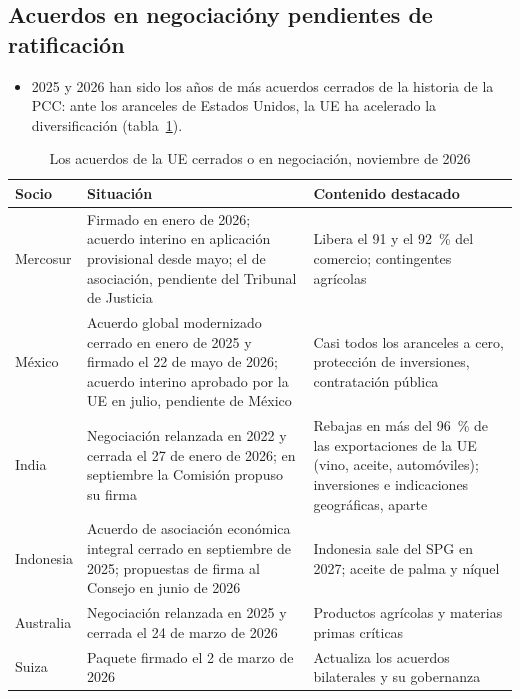 \documentclass[11pt]{article}
\begin{document}
\subsection{Acuerdos en negociación\cortetitulo y pendientes de ratificación}\label{sec:negociacion}

\begin{itemize}
\item 2025 y 2026 han sido los años de más acuerdos cerrados de la historia de la PCC: ante los aranceles de Estados Unidos, la UE ha acelerado la diversificación (tabla~\ref{tab:negociacion}).
\end{itemize}

\begin{table}[H]
\centering
\caption{Los acuerdos de la UE cerrados o en negociación, noviembre de 2026}\label{tab:negociacion}
\footnotesize
\begin{tabular}{>{\raggedright\arraybackslash}m{2.6cm}>{\raggedright\arraybackslash}m{6.2cm}>{\raggedright\arraybackslash}m{5.8cm}}
\toprule
\rowcolor{tceeazulpalido} \textbf{Socio} & \textbf{Situación} & \textbf{Contenido destacado}\\
\midrule
Mercosur & Firmado en enero de 2026; acuerdo interino en aplicación provisional desde mayo; el de asociación, pendiente del Tribunal de Justicia & Libera el 91 y el 92~\% del comercio; contingentes agrícolas\\
México & Acuerdo global modernizado cerrado en enero de 2025 y firmado el 22 de mayo de 2026; acuerdo interino aprobado por la UE en julio, pendiente de México & Casi todos los aranceles a cero, protección de inversiones, contratación pública\\
India & Negociación relanzada en 2022 y cerrada el 27 de enero de 2026; en septiembre la Comisión propuso su firma & Rebajas en más del 96~\% de las exportaciones de la UE (vino, aceite, automóviles); inversiones e indicaciones geográficas, aparte\\
Indonesia & Acuerdo de asociación económica integral cerrado en septiembre de 2025; propuestas de firma al Consejo en junio de 2026 & Indonesia sale del SPG en 2027; aceite de palma y níquel\\
Australia & Negociación relanzada en 2025 y cerrada el 24 de marzo de 2026 & Productos agrícolas y materias primas críticas\\
Suiza & Paquete firmado el 2 de marzo de 2026 & Actualiza los acuerdos bilaterales y su gobernanza\\

\end{tabular}
\end{table}
\end{document}
